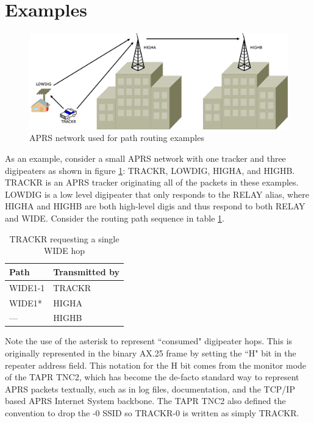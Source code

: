 \section{Examples}

\begin{figure}
	\centering
	\includegraphics[width=1.0\textwidth]{src/dia/pathdemo}
	\caption{APRS network used for path routing examples}
	\label{fig:pathdemo}
\end{figure}

As an example, consider a small APRS network with one tracker and three
digipeaters as shown in figure \ref{fig:pathdemo}: TRACKR, LOWDIG, HIGHA, and HIGHB.
TRACKR is an APRS tracker originating all of the packets in these examples.
LOWDIG is a low level digipeater that only responds to the RELAY alias, 
where HIGHA and HIGHB are both high-level digis and thus respond to
both RELAY and WIDE.
Consider the routing path sequence in table \ref{tab:singlewide}.
\begin{table}[!h]
	\centering
	\begin{tabular}{ | l | l | }
		\hline
		Path & Transmitted by \\ \hline
		WIDE1-1 & TRACKR \\ \hline
		WIDE1* & HIGHA \\ \hline
		--- & HIGHB \\ \hline
	\end{tabular}
	\caption{TRACKR requesting a single WIDE hop}
	\label{tab:singlewide}
\end{table}

Note the use of the asterisk to represent ``consumed" digipeater hops.
This is originally represented in the binary AX.25 frame
by setting the ``H" bit in the repeater address field.
This notation for the H bit comes from the monitor mode
of the TAPR TNC2, which has become the de-facto standard way to represent
APRS packets textually, such as in log files, documentation, and the
TCP/IP based APRS Internet System backbone.
The TAPR TNC2 also defined the convention to drop the -0 SSID so TRACKR-0 is
written as simply TRACKR.

